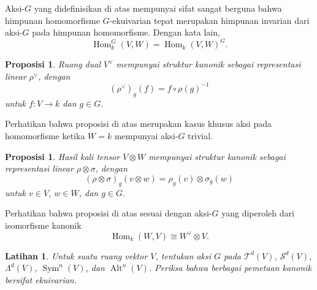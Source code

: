 \documentclass[12pt]{article}
\theoremstyle{plain}
\newtheorem{proposition}[theorem]{Proposisi}
\newtheorem{exercise}[theorem]{Latihan}
\theoremstyle{definition}
\theoremstyle{remark}
\numberwithin{equation}{section}
\begin{document}
Aksi-$G$ yang didefinisikan di atas mempunyai sifat sangat berguna bahwa
himpunan homomorfisme $G$-ekuivarian tepat merupakan himpunan invarian dari
aksi-$G$ pada himpunan homomorfisme. Dengan kata lain,
\[
\operatorname{Hom}^G_k(V,W) = \operatorname{Hom}_k(V,W)^G .
\]

\begin{proposition}
Ruang dual $V^\vee$ mempunyai struktur kanonik sebagai representasi
linear $\rho^\vee$, dengan
\[
 (\rho^\vee)_g(f) = f \circ \rho(g)^{-1}
\]
untuk $f : V \to k$ dan $g \in G$.
\end{proposition}

Perhatikan bahwa proposisi di atas merupakan kasus khusus aksi pada
homomorfisme ketika $W=k$ mempunyai aksi-$G$ trivial.

\begin{proposition}
Hasil kali tensor $V \otimes W$ mempunyai struktur kanonik sebagai representasi
linear $\rho \otimes \sigma$, dengan
\[
(\rho \otimes \sigma)_g(v \otimes w) = \rho_g(v) \otimes \sigma_g(w)
\]
untuk $v \in V$, $w \in W$, dan $g \in G$.
\end{proposition}

Perhatikan bahwa proposisi di atas sesuai dengan aksi-$G$ yang
diperoleh dari isomorfisme kanonik
\[
\operatorname{Hom}_k(W,V) \cong W^\vee \otimes V. 
\]

\begin{exercise}
Untuk suatu ruang vektor $V$,
tentukan aksi $G$ pada
$\mathcal{T}^d(V)$, $\mathcal{S}^d(V)$, $\Lambda^d(V)$,
$\operatorname{Sym}^n(V)$, dan $\operatorname{Alt}^n(V)$.
Periksa bahwa berbagai pemetaan kanonik bersifat ekuivarian.
\end{exercise}




\end{document}
